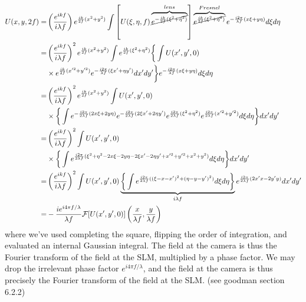 \documentclass[../../main.tex]{subfiles}
\begin{document}
\begin{equation}
   \begin{aligned}
   U(x,y,2f)=&\left(\frac{e^{ikf}}{i\lambda f}\right)e^{\frac{ik}{2 f}(x^2+y^2)}
   \int \left[U(\xi,\eta,f)
   \overbrace{\cancel{e^{-\frac{ik}{2f}(\xi^2+\eta^2)}}}^{lens
   }\right]
   \overbrace{\cancel{e^{ \frac{ik}{2f}(\xi^2+\eta^2)}}}^{Fresnel}
   e^{-\frac{i 2\pi}{\lambda f}(x\xi+y\eta)}d\xi d\eta\\
   =&\left(\frac{e^{ikf}}{i\lambda f}\right)^2e^{\frac{ik}{2 f}(x^2+y^2)}
   \int e^{\frac{ik}{2 f}(\xi^2+\eta^2)} \bigg\{\int U(x',y',0)\\
   &\times  e^{ \frac{ik}{2f}(x'^2+y'^2)}e^{-\frac{i 2\pi}{\lambda f}(\xi x'+\eta y')}
     dx' dy'\bigg\} e^{-\frac{i 2\pi}{\lambda f}(x\xi+y\eta)} d\xi d\eta\\
   =&\left(\frac{e^{ikf}}{i\lambda f}\right)^2e^{\frac{ik}{2 f}(x^2+y^2)}
   \int U(x',y',0) \\
   &\times\bigg\{\int   
   e^{-\frac{i 2\pi}{2 \lambda f}(2x\xi+2y\eta)} 
   e^{-\frac{i 2\pi}{2 \lambda f}(2\xi x'+2\eta y')} 
   e^{\frac{i2\pi}{2 \lambda f}(\xi^2+\eta^2)} 
   e^{ \frac{i2\pi}{2 \lambda f}(x'^2+y'^2)}
   d\xi d\eta\bigg\} dx' dy'\\
   =&\left(\frac{e^{ikf}}{i\lambda f}\right)^2
   \int U(x',y',0) \\
   &\times\bigg\{\int   
   e^{\frac{i 2\pi}{2 \lambda f}(\xi^2+\eta^2-2x\xi-2y\eta-2\xi x'-2\eta y'+x'^2+y'^2+x^2+y^2)} 
   d\xi d\eta\bigg\} dx' dy'\\
   =&\left(\frac{e^{ikf}}{i\lambda f}\right)^2
   \int U(x',y',0) \underbrace{\bigg\{\int   
   e^{\frac{i 2\pi}{2 \lambda f}((\xi-x-x')^2+(\eta-y-y')^2)} 
   d\xi d\eta\bigg\}}_{i\lambda f}  e^{\frac{i 2\pi}{2 \lambda f}(2x'x-2y'y)}dx' dy'\\
   =&-\frac{ie^{i4\pi f/\lambda}}{\lambda f}\mathcal{F}[U(x',y',0)]\left(\frac{x}{\lambda f},\frac{y}{\lambda f}\right)
   \end{aligned}
\end{equation}
where we've used completing the square, flipping the order of integration, and evaluated an internal Gaussian integral. The field at the camera is thus the Fourier transform of the field at the SLM, multiplied by a phase factor. We may drop the irrelevant phase factor $e^{i4\pi f/\lambda}$, and the field at the camera is thus  precisely the Fourier transform of the field at the SLM. (see goodman section 6.2.2)
\end{document}
